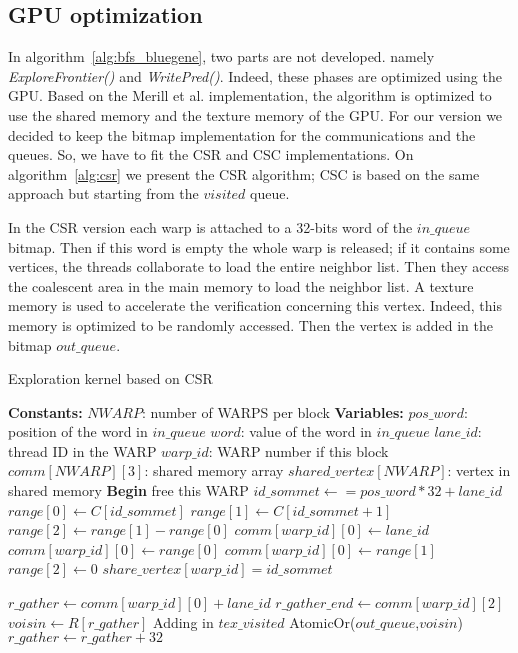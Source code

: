 \subsection{GPU optimization}

In algorithm~\ref{alg:bfs_bluegene}, two parts are not developed. namely \textit{ExploreFrontier()} and \textit{WritePred()}. Indeed, these phases are optimized using the GPU. 
Based on the Merill et al. implementation, the algorithm is optimized to use the shared memory and the texture memory of the GPU. 
For our version we decided to keep the bitmap implementation for the communications and the queues. So, we have to fit the CSR and CSC implementations. 
On algorithm~\ref{alg:csr} we present the CSR algorithm;
CSC is based on the same approach but starting from the $visited$ queue. 

In the CSR version each warp is attached to a 32-bits word of the $in\_queue$ bitmap. 
Then if this word is empty the whole warp is released; 
if it contains some vertices, the threads collaborate to load the entire neighbor list. 
Then they access the coalescent area in the main memory to load the neighbor list. 
A texture memory is used to accelerate the verification concerning this vertex. Indeed, this memory is optimized to be randomly accessed. 
Then the vertex is added in the bitmap $out\_queue$.

\begin{algorithm}
\caption{Exploration kernel based on CSR}\label{alg:csr}
\begin{algorithmic}[1]
\State \textbf{Constants:}
\State $NWARP$: number of WARPS per block
\State 
\State \textbf{Variables:}
\State $pos\_word$: position of the word in $in\_queue$
\State $word$: value of the word in $in\_queue$
\State $lane\_id$: thread ID in the WARP
\State $warp\_id$: WARP number if this block
\State $comm[NWARP][3]$: shared memory array
\State $shared\_vertex[NWARP]$: vertex in shared memory
\State 
\State \textbf{Begin}
\State free this WARP
\EndIf
{}
\State $id\_sommet \gets = pos\_word*32+lane\_id$
\State $range[0] \gets C[id\_sommet]$ 
\State $range[1] \gets C[id\_sommet +1 ]$ 
\State $range[2] \gets range[1] - range[0]$ 
\EndIf
{}
\State $comm[warp\_id][0] \gets lane\_id$
\EndIf
{}
\State $comm[warp\_id][0] \gets range[0]$
\State $comm[warp\_id][0] \gets range[1]$
\State $range[2] \gets 0$
\State $share\_vertex[warp\_id] = id\_sommet$ 
\EndIf

\State $r\_gather \gets comm[warp\_id][0] + lane\_id$
\State $r\_gather\_end \gets comm[warp\_id][2] $
	\State $voisin \gets R[r\_gather]$
		\State Adding in $tex\_visited$
		\State AtomicOr($out\_queue$,$voisin$)
	\EndIf
	\State $r\_gather \gets r\_gather + 32$
\EndWhile
\EndWhile
\end{algorithmic}
\end{algorithm}

